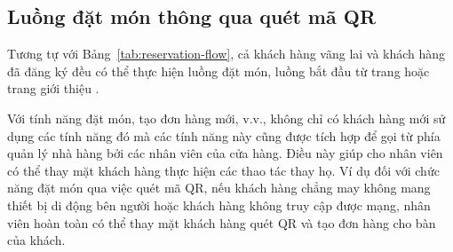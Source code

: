 \subsection{Luồng đặt món thông qua quét mã QR}\label{sec:order-flow}
Tương tự với Bảng~\ref{tab:reservation-flow}, cả khách hàng vãng lai và khách hàng đã đăng ký đều có thể thực hiện luồng đặt món, luồng bắt đầu từ trang  hoặc trang giới thiệu .

\begin{table}[]
\caption{Bảng mô tả luồng nghiệp vụ của chức năng đặt món qua QR}
\label{tab:order-flow}
\end{table}
Với tính năng đặt món, tạo đơn hàng mới, v.v., không chỉ có khách hàng mới sử dụng các tính năng đó mà các tính năng này cũng được tích hợp để gọi từ phía quản lý nhà hàng bởi các nhân viên của cửa hàng.
Điều này giúp cho nhân viên có thể thay mặt khách hàng thực hiện các thao tác thay họ.
Ví dụ đối với chức năng đặt món qua việc quét mã QR, nếu khách hàng chẳng may không mang thiết bị di động bên người hoặc khách hàng không truy cập được mạng, nhân viên hoàn toàn có thể thay mặt khách hàng quét QR và tạo đơn hàng cho bàn của khách.

